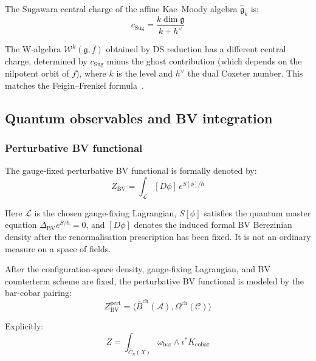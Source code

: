 \begin{theorem}
\label{thm:central-charge-from-4d}
The Sugawara central charge of the affine Kac--Moody algebra $\widehat{\mathfrak{g}}_k$ is:
\[c_{\mathrm{Sug}} = \frac{k \dim \mathfrak{g}}{k + h^\vee}\]

The W-algebra $\mathcal{W}^k(\mathfrak{g}, f)$ obtained by DS reduction has a different central charge, determined by $c_{\mathrm{Sug}}$ minus the ghost contribution (which depends on the nilpotent orbit of $f$), where $k$ is the level and $h^\vee$ the dual Coxeter number. This matches the Feigin--Frenkel formula~\cite{Feigin-Frenkel}.
\end{theorem}

\subsection{Quantum observables and BV integration}

\subsubsection{Perturbative BV functional}

\begin{definition}
The gauge-fixed perturbative BV functional is formally denoted by:
\[Z_{\text{BV}} = \int_{\mathcal{L}} [D\phi] \, e^{S[\phi]/\hbar}\]

Here $\mathcal{L}$ is the chosen gauge-fixing Lagrangian,
$S[\phi]$ satisfies the quantum master equation
$\Delta_{\text{BV}} e^{S/\hbar} = 0$, and $[D\phi]$ denotes the
induced formal BV Berezinian density after the renormalisation
prescription has been fixed. It is not an ordinary measure on a
space of fields.
\end{definition}

\begin{remark}
\label{rem:bv-integration-bar-cobar}
After the configuration-space density, gauge-fixing Lagrangian, and BV
counterterm scheme are fixed, the perturbative BV functional is modeled
by the bar-cobar pairing:
\[Z_{\text{BV}}^{\mathrm{pert}} =
\langle \bar{B}^{\text{ch}}(\mathcal{A}),
\Omega^{\text{ch}}(\mathcal{C}) \rangle\]

Explicitly:
\[Z = \int_{\overline{C}_n(X)} \omega_{\text{bar}} \wedge \iota^* K_{\text{cobar}}\]
\end{remark}

